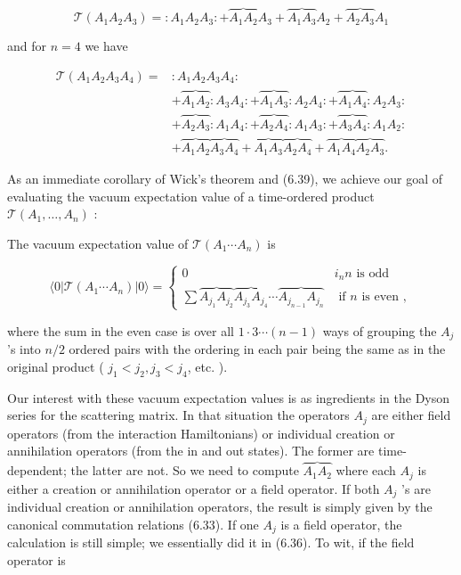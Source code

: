 \documentclass[10pt, letterpaper]{article}
\begin{document}
$$
\mathcal{T}\left(A_{1} A_{2} A_{3}\right)=: A_{1} A_{2} A_{3}:+\overbrace{A_{1} A_{2}} A_{3}+\overbrace{A_{1} A_{3}} A_{2}+\overbrace{A_{2} A_{3}} A_{1}
$$

and for $n=4$ we have

$$
\begin{aligned}
\mathcal{T}\left(A_{1} A_{2} A_{3} A_{4}\right)= & : A_{1} A_{2} A_{3} A_{4}: \\
& +\overbrace{A_{1} A_{2}}: A_{3} A_{4}:+\overbrace{A_{1} A_{3}}: A_{2} A_{4}:+\overbrace{A_{1} A_{4}}: A_{2} A_{3}: \\
& +\overbrace{A_{2} A_{3}}: A_{1} A_{4}:+\overbrace{A_{2} A_{4}}: A_{1} A_{3}:+\overbrace{A_{3} A_{4}}: A_{1} A_{2}: \\
& +\overbrace{A_{1} A_{2}} \overbrace{A_{3} A_{4}}+\overbrace{A_{1} A_{3}} \overbrace{A_{2} A_{4}}+\overbrace{A_{1} A_{4}} \overbrace{A_{2} A_{3}} .
\end{aligned}
$$

As an immediate corollary of Wick's theorem and (6.39), we achieve our goal of evaluating the vacuum expectation value of a time-ordered product $\mathcal{T}\left(A_{1}, \ldots, A_{n}\right)$ :

The vacuum expectation value of $\mathcal{T}\left(A_{1} \cdots A_{n}\right)$ is

$$
\langle 0| \mathcal{T}\left(A_{1} \cdots A_{n}\right)|0\rangle= \begin{cases}0 & i_{n} n \text { is odd } \\ \sum \overbrace{A_{j_{1}} A_{j_{2}}} \overbrace{A_{j_{3}} A_{j_{4}}} \cdots \overbrace{A_{j_{n-1}} A_{j_{n}}} & \text { if } n \text { is even },\end{cases}
$$

where the sum in the even case is over all $1 \cdot 3 \cdots(n-1)$ ways of grouping the $A_{j}$ 's into $n / 2$ ordered pairs with the ordering in each pair being the same as in the original product ( $j_{1}<j_{2}, j_{3}<j_{4}$, etc. ).

Our interest with these vacuum expectation values is as ingredients in the Dyson series for the scattering matrix. In that situation the operators $A_{j}$ are either field operators (from the interaction Hamiltonians) or individual creation or annihilation operators (from the in and out states). The former are time-dependent; the latter are not. So we need to compute $\overbrace{A_{1} A_{2}}$ where each $A_{j}$ is either a creation or annihilation operator or a field operator. If both $A_{j}$ 's are individual creation or annihilation operators, the result is simply given by the canonical commutation relations (6.33). If one $A_{j}$ is a field operator, the calculation is still simple; we essentially did it in (6.36). To wit, if the field operator is
\end{document}
